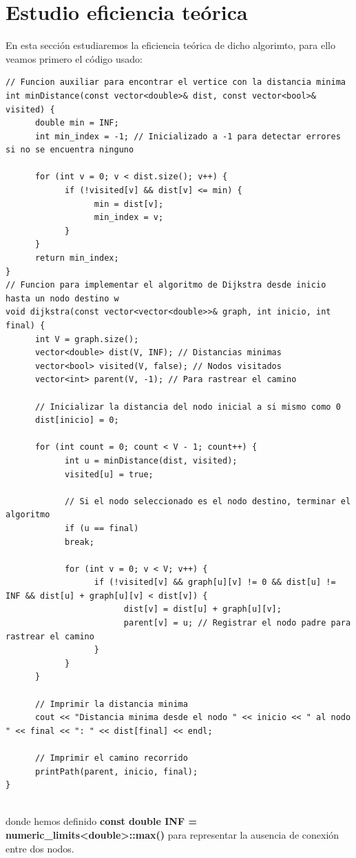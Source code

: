 \documentclass[11pt,openany]{book}
\begin{document}
\section{Estudio eficiencia teórica}
En esta sección estudiaremos la eficiencia teórica de dicho algorimto, para ello veamos primero el código usado:
\begin{lstlisting}
// Funcion auxiliar para encontrar el vertice con la distancia minima
int minDistance(const vector<double>& dist, const vector<bool>& visited) {
      double min = INF;
      int min_index = -1; // Inicializado a -1 para detectar errores si no se encuentra ninguno

      for (int v = 0; v < dist.size(); v++) {
            if (!visited[v] && dist[v] <= min) {
                  min = dist[v];
                  min_index = v;
            }
      }
      return min_index;
}
// Funcion para implementar el algoritmo de Dijkstra desde inicio hasta un nodo destino w
void dijkstra(const vector<vector<double>>& graph, int inicio, int final) {
      int V = graph.size();
      vector<double> dist(V, INF); // Distancias minimas
      vector<bool> visited(V, false); // Nodos visitados
      vector<int> parent(V, -1); // Para rastrear el camino

      // Inicializar la distancia del nodo inicial a si mismo como 0
      dist[inicio] = 0;
      
      for (int count = 0; count < V - 1; count++) {
            int u = minDistance(dist, visited);
            visited[u] = true;

            // Si el nodo seleccionado es el nodo destino, terminar el algoritmo
            if (u == final)
            break;

            for (int v = 0; v < V; v++) {
                  if (!visited[v] && graph[u][v] != 0 && dist[u] != INF && dist[u] + graph[u][v] < dist[v]) {
                        dist[v] = dist[u] + graph[u][v];
                        parent[v] = u; // Registrar el nodo padre para rastrear el camino
                  }
            }
      }
      
      // Imprimir la distancia minima
      cout << "Distancia minima desde el nodo " << inicio << " al nodo " << final << ": " << dist[final] << endl;

      // Imprimir el camino recorrido
      printPath(parent, inicio, final);
}
       
\end{lstlisting}
donde hemos definido \textbf{const double INF = numeric\_limits<double>::max()} para representar la ausencia de conexión entre dos nodos.
\end{document}
